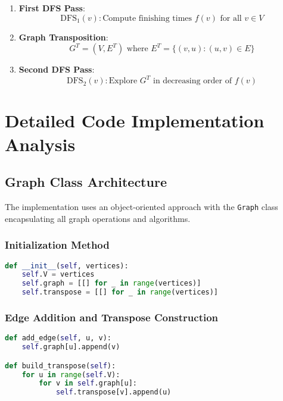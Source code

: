 \documentclass{book}
\theoremstyle{definition}
\begin{document}
\begin{enumerate}
    \item \textbf{First DFS Pass}: 
    \begin{equation}
    \text{DFS}_1(v): \text{Compute finishing times } f(v) \text{ for all } v \in V
    \end{equation}
    
    \item \textbf{Graph Transposition}:
    \begin{equation}
    G^T = (V, E^T) \text{ where } E^T = \{(v, u) : (u, v) \in E\}
    \end{equation}
    
    \item \textbf{Second DFS Pass}:
    \begin{equation}
    \text{DFS}_2(v): \text{Explore } G^T \text{ in decreasing order of } f(v)
    \end{equation}
\end{enumerate}

\section{Detailed Code Implementation Analysis}

\subsection{Graph Class Architecture}

The implementation uses an object-oriented approach with the \texttt{Graph} class encapsulating all graph operations and algorithms.

\subsubsection{Initialization Method}

\begin{lstlisting}[language=Python]
def __init__(self, vertices):
    self.V = vertices
    self.graph = [[] for _ in range(vertices)]
    self.transpose = [[] for _ in range(vertices)]
\end{lstlisting}


\subsubsection{Edge Addition and Transpose Construction}

\begin{lstlisting}[language=Python]
def add_edge(self, u, v):
    self.graph[u].append(v)

def build_transpose(self):
    for u in range(self.V):
        for v in self.graph[u]:
            self.transpose[v].append(u)
\end{lstlisting}
\end{document}
